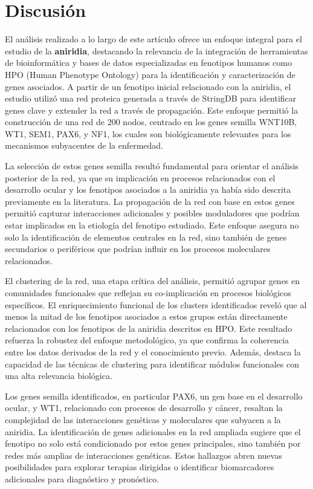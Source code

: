 \section{Discusión}

El análisis realizado a lo largo de este artículo ofrece un enfoque integral para el estudio de la \textbf{aniridia}, destacando la relevancia de la integración de herramientas de bioinformática y bases de datos especializadas en fenotipos humanos como HPO (Human Phenotype Ontology) para la identificación y caracterización de genes asociados. A partir de un fenotipo inicial relacionado con la aniridia, el estudio utilizó una red proteica generada a través de StringDB para identificar genes clave y extender la red a través de propagación. Este enfoque permitió la construcción de una red de 200 nodos, centrado en los genes semilla WNT10B, WT1, SEM1, PAX6, y NF1, los cuales son biológicamente relevantes para los mecanismos subyacentes de la enfermedad.

La selección de estos genes semilla resultó fundamental para orientar el análisis posterior de la red, ya que su implicación en procesos relacionados con el desarrollo ocular y los fenotipos asociados a la aniridia ya había sido descrita previamente en la literatura. La propagación de la red con base en estos genes permitió capturar interacciones adicionales y posibles moduladores que podrían estar implicados en la etiología del fenotipo estudiado. Este enfoque asegura no solo la identificación de elementos centrales en la red, sino también de genes secundarios o periféricos que podrían influir en los procesos moleculares relacionados.

El clustering de la red, una etapa crítica del análisis, permitió agrupar genes en comunidades funcionales que reflejan su co-implicación en procesos biológicos específicos. El enriquecimiento funcional de los clusters identificados reveló que al menos la mitad de los fenotipos asociados a estos grupos están directamente relacionados con los fenotipos de la aniridia descritos en HPO. Este resultado refuerza la robustez del enfoque metodológico, ya que confirma la coherencia entre los datos derivados de la red y el conocimiento previo. Además, destaca la capacidad de las técnicas de clustering para identificar módulos funcionales con una alta relevancia biológica.

Los genes semilla identificados, en particular PAX6, un gen base en el desarrollo ocular, y WT1, relacionado con procesos de desarrollo y cáncer, resaltan la complejidad de las interacciones genéticas y moleculares que subyacen a la aniridia. La identificación de genes adicionales en la red ampliada sugiere que el fenotipo no solo está condicionado por estos genes principales, sino también por redes más amplias de interacciones genéticas. Estos hallazgos abren nuevas posibilidades para explorar terapias dirigidas o identificar biomarcadores adicionales para diagnóstico y pronóstico.

